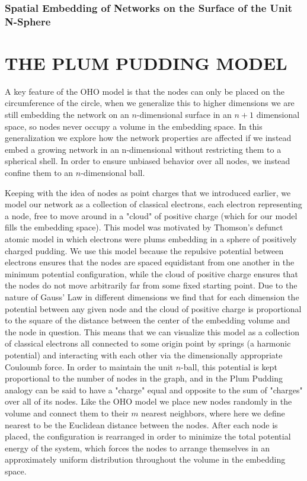 \documentclass[aps,pre,reprint,superscriptaddress,amsmath,amssymb]{revtex4-1}
\begin{document}
\subsubsection{Spatial Embedding of Networks on the Surface of the Unit N-Sphere}


\section{THE PLUM PUDDING MODEL}
A key feature of the OHO model is that the nodes can only be placed on the circumference of the circle, when we generalize this to higher dimensions we are still embedding the network on an $n$-dimensional surface in an $n+1$ dimensional space, so nodes never occupy a volume in the embedding space.
In this generalization we explore how the network properties are affected if we instead embed a growing network in an n-dimensional without restricting them to a spherical shell.  In order to ensure unbiased behavior over all nodes, we instead confine them to an $n$-dimensional ball. 

Keeping with the idea of nodes as point charges that we introduced earlier, we model our network as a collection of classical electrons, each electron representing a node, free to move around in a "cloud" of positive charge (which for our model fills the embedding space).
This model was motivated by Thomson's defunct atomic model in which electrons were plums embedding in a sphere of positively charged pudding.
We use this model because the repulsive potential between electrons ensures that the nodes are spaced equidistant from one another in the minimum potential configuration, while the cloud of positive charge ensures that the nodes do not move arbitrarily far from some fixed starting point.
Due to the nature of Gauss' Law in different dimensions we find that for each dimension the potential between any given node and the cloud of positive charge is proportional to the square of the distance between the center of the embedding volume and the node in question.
This means that we can visualize this model as a collection of classical electrons all connected to some origin point by springs (a harmonic potential) and interacting with each other via the dimensionally appropriate Couloumb force.  In order to maintain the unit $n$-ball, this potential is kept proportional to the number of nodes in the graph, and in the Plum Pudding analogy can be said to have a "charge" equal and opposite to the sum of "charges" over all of its nodes.
Like the OHO model we place new nodes randomly in the volume and connect them to their $m$ nearest neighbors, where here we define nearest to be the Euclidean distance between the nodes.
After each node is placed, the configuration is rearranged in order to minimize the total potential energy of the system, which forces the nodes to arrange themselves in an approximately uniform distribution throughout the volume in the embedding space.
\end{document}
